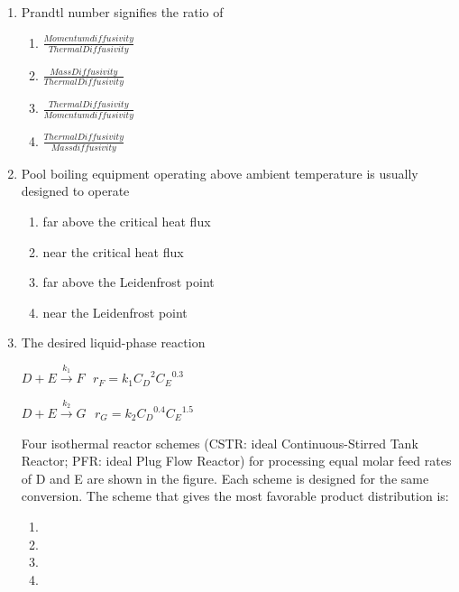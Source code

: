 \documentclass[journal,12pt,onecolumn]{IEEEtran}
\theoremstyle{remark}
\begin{document}
\begin{enumerate}
    \item Prandtl number signifies the ratio of
\begin{multicols}{2}
    \begin{enumerate}
    \item $\frac{Momentum diffusivity}{Thermal Diffusivity}$
    \item $\frac{Mass Diffusivity}{Thermal Diffusivity}$
    \item $\frac{Thermal Diffusivity}{Momentum diffusivity}$
    \item $\frac{Thermal Diffusivity}{Mass diffusivity}$
    \end{enumerate}
\end{multicols}

    \item Pool boiling equipment operating above ambient temperature is usually designed to operate
\begin{multicols}{2}
    \begin{enumerate}
        \item far above the critical heat flux
        \item near the critical heat flux
        \item far above the Leidenfrost point
        \item near the Leidenfrost point
    \end{enumerate}
\end{multicols}


    \item  The desired liquid-phase reaction

    

     $D + E \overset{k_1}{\to} F \hspace{8pt} r_F = k_1 {C_D}^{2} {C_E}^{0.3}$ 

   
        
            $D + E \overset{k_2}{\to} G \hspace{8pt} r_G = k_2 {C_D}^{0.4} {C_E}^{1.5}$
    
        
Four isothermal reactor schemes (CSTR: ideal Continuous-Stirred Tank Reactor; PFR: ideal Plug Flow Reactor) for processing equal molar feed rates of D and E are shown in the figure. Each scheme is designed for the same conversion. The scheme that gives the most favorable product distribution is:

    \begin{multicols}{2}
    \begin{enumerate}
        \item 
        \item 
        \item 
        \item 
    \end{enumerate}
    \end{multicols}


\end{enumerate}
\end{document}
